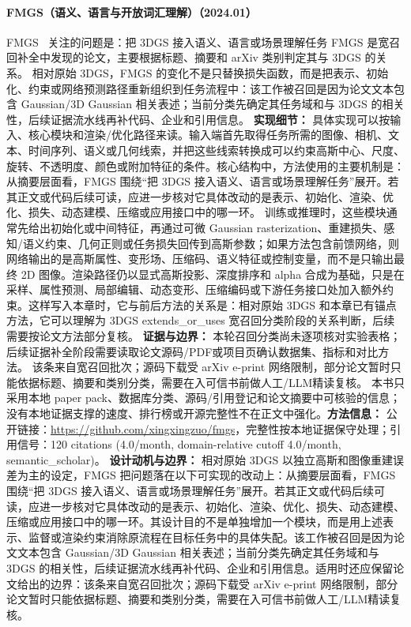 \paragraph{FMGS（语义、语言与开放词汇理解）（2024.01）}
FMGS~\cite{2401_01970} 关注的问题是：把 3DGS 接入语义、语言或场景理解任务 FMGS 是宽召回补全中发现的论文，主要根据标题、摘要和 arXiv 类别判定其与 3DGS 的关系。
相对原始 3DGS，FMGS 的变化不是只替换损失函数，而是把表示、初始化、约束或网络预测路径重新组织到任务流程中：该工作被召回是因为论文文本包含 Gaussian/3D Gaussian 相关表述；当前分类先确定其任务域和与 3DGS 的相关性，后续证据流水线再补代码、企业和引用信息。
\textbf{实现细节：} 具体实现可以按输入、核心模块和渲染/优化路径来读。输入端首先取得任务所需的图像、相机、文本、时间序列、语义或几何线索，并把这些线索转换成可以约束高斯中心、尺度、旋转、不透明度、颜色或附加特征的条件。核心结构中，方法使用的主要机制是：从摘要层面看，FMGS 围绕“把 3DGS 接入语义、语言或场景理解任务”展开。若其正文或代码后续可读，应进一步核对它具体改动的是表示、初始化、渲染、优化、损失、动态建模、压缩或应用接口中的哪一环。 训练或推理时，这些模块通常先给出初始化或中间特征，再通过可微 Gaussian rasterization、重建损失、感知/语义约束、几何正则或任务损失回传到高斯参数；如果方法包含前馈网络，则网络输出的是高斯属性、变形场、压缩码、语义特征或控制变量，而不是只输出最终 2D 图像。渲染路径仍以显式高斯投影、深度排序和 alpha 合成为基础，只是在采样、属性预测、局部编辑、动态变形、压缩编码或下游任务接口处加入额外约束。这样写入本章时，它与前后方法的关系是：相对原始 3DGS 和本章已有锚点方法，它可以理解为 3DGS extends\_or\_uses 宽召回分类阶段的关系判断，后续需要按论文方法部分复核。
\textbf{证据与边界：} 本轮召回分类尚未逐项核对实验表格；后续证据补全阶段需要读取论文源码/PDF或项目页确认数据集、指标和对比方法。 该条来自宽召回批次；源码下载受 arXiv e-print 网络限制，部分论文暂时只能依据标题、摘要和类别分类，需要在入可信书前做人工/LLM精读复核。 本书只采用本地 paper pack、数据库分类、源码/引用登记和论文摘要中可核验的信息；没有本地证据支撑的速度、排行榜或开源完整性不在正文中强化。\textbf{方法信息：} 公开链接：\url{https://github.com/xingxingzuo/fmgs}，完整性按本地证据保守处理；引用信号：120 citations (4.0/month, domain-relative cutoff 4.0/month, semantic\_scholar)。
\textbf{设计动机与边界：} 相对原始 3DGS 以独立高斯和图像重建误差为主的设定，FMGS 把问题落在以下可实现的改动上：从摘要层面看，FMGS 围绕“把 3DGS 接入语义、语言或场景理解任务”展开。若其正文或代码后续可读，应进一步核对它具体改动的是表示、初始化、渲染、优化、损失、动态建模、压缩或应用接口中的哪一环。其设计目的不是单独增加一个模块，而是用上述表示、监督或渲染约束消除原流程在目标任务中的具体失配。该工作被召回是因为论文文本包含 Gaussian/3D Gaussian 相关表述；当前分类先确定其任务域和与 3DGS 的相关性，后续证据流水线再补代码、企业和引用信息。适用时还应保留论文给出的边界：该条来自宽召回批次；源码下载受 arXiv e-print 网络限制，部分论文暂时只能依据标题、摘要和类别分类，需要在入可信书前做人工/LLM精读复核。
